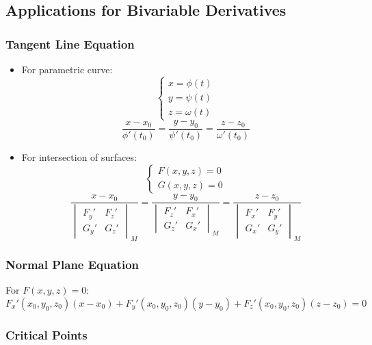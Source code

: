 \documentclass{article}
\begin{document}
\subsection{Applications for Bivariable Derivatives}

\subsubsection{Tangent Line Equation}

\begin{itemize}
    \item For parametric curve:
    \[
        \begin{cases}
            x = \phi(t) \\
            y = \psi(t) \\
            z = \omega(t)
        \end{cases}
    \]
    \[
        \frac{x - x_0}{\phi'(t_0)} = \frac{y - y_0}{\psi'(t_0)} = \frac{z - z_0}{\omega'(t_0)}
    \]

    \item For intersection of surfaces:
    \[
        \begin{cases}
            F(x, y, z) = 0 \\
            G(x, y, z) = 0
        \end{cases}
    \]
    \[
        \frac{x - x_0}{\begin{vmatrix} F_y' & F_z' \\ G_y' & G_z' \end{vmatrix}_M} = \frac{y - y_0}{\begin{vmatrix} F_z' & F_x' \\ G_z' & G_x' \end{vmatrix}_M} = \frac{z - z_0}{\begin{vmatrix} F_x' & F_y' \\ G_x' & G_y' \end{vmatrix}_M}
    \]
\end{itemize}

\subsubsection{Normal Plane Equation}

For $F(x, y, z) = 0$:
\[
    F_x'(x_0, y_0, z_0)(x - x_0) + F_y'(x_0, y_0, z_0)(y - y_0) + F_z'(x_0, y_0, z_0)(z - z_0) = 0
\]

\subsubsection{Critical Points}
\end{document}
